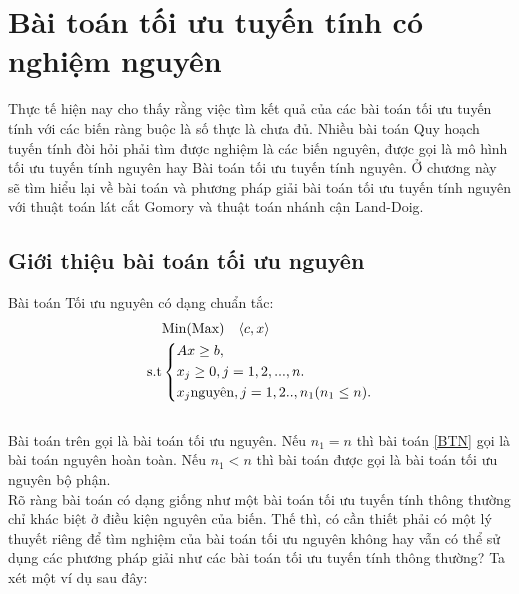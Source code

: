 \documentclass[12pt,a4paper]{report}
\begin{document}
\chapter{Bài toán tối ưu tuyến tính có nghiệm nguyên}
Thực tế hiện nay cho thấy rằng việc tìm kết quả của các bài toán tối ưu tuyến tính với các biến ràng buộc là số thực là chưa đủ. Nhiều bài toán Quy hoạch tuyến tính đòi hỏi phải tìm được nghiệm là các biến nguyên, được gọi là mô hình tối ưu tuyến tính nguyên hay Bài toán tối ưu tuyến tính nguyên. Ở chương này sẽ tìm hiểu lại về bài toán và phương pháp giải bài toán tối ưu tuyến tính nguyên với  thuật toán lát cắt Gomory và thuật toán nhánh cận Land-Doig.

\section{Giới thiệu bài toán tối ưu nguyên}
Bài toán Tối ưu nguyên có dạng chuẩn tắc:\\
    \begin{equation}\label{BTN}
     \begin{split}
          & {\rm{Min (Max)}} \quad \langle c,x \rangle\\
          \rm{s.t} &\left\{\begin{split}
            & Ax\ge b,\\
            & x_j \ge 0, j=1,2,...,n.\\
            & x_j \text{nguyên}, j=1,2..,n_1 (n_1\le n).\\
           \end{split}\right.
       \end{split}
   \end{equation}
   \\
   
 Bài toán trên gọi là bài toán tối ưu nguyên. Nếu $n_1=n$ thì bài toán \eqref{BTN} gọi là bài toán nguyên hoàn toàn. Nếu $n_1 <n$ thì bài toán được gọi là bài toán tối ưu nguyên bộ phận.\\
Rõ ràng bài toán có dạng giống như một bài toán tối ưu tuyến tính thông thường chỉ khác biệt ở điều kiện nguyên của biến. Thế thì, có cần thiết phải có một lý thuyết riêng để tìm nghiệm của bài toán tối ưu nguyên không hay vẫn có thể sử dụng các phương pháp giải như các bài toán tối ưu tuyến tính thông thường? Ta xét một ví dụ sau đây:\\
\end{document}
